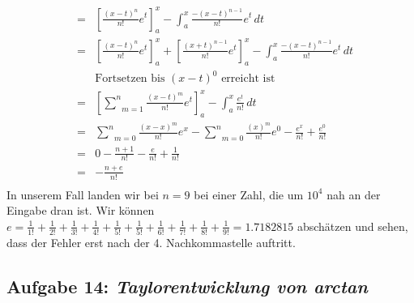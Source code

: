 \documentclass[11pt,a4paper,ngerman]{article}
\begin{document}
\begin{enumerate}[(i)]
$$\begin{array}{rcl}
                &=& \left[\frac{(x-t)^{n}}{n!}e^t\right]_a^x - \int_a^x \frac{-(x-t)^{n-1}}{n!}e^t \, dt\\
                &=& \left[\frac{(x-t)^{n}}{n!}e^t\right]_a^x + \left[\frac{(x+t)^{n-1}}{n!}e^t\right]_a^x
                    - \int_a^x \frac{-(x-t)^{n-1}}{n!}e^t \, dt\\
                && \text{Fortsetzen bis $(x-t)^0$ erreicht ist} \\
                &=& \left[ \underset{m=1}{\overset{n}{\sum}} \frac{(x-t)^m}{n!} e^t \right]_a^x 
                    - \int_a^x \frac{e^t}{n!} \, dt\\
                &=& \underset{m=0}{\overset{n}{\sum}} \frac{(x-x)^m}{n!}e^x - \underset{m=0}{\overset{n}{\sum}} \frac{(x)^m}{n!}e^0 - \frac{e^x}{n!} + \frac{e^0}{n!}\\
                &=& 0 - \frac{n+1}{n!} - \frac{e}{n!} + \frac{1}{n!}\\
                &=& - \frac{n+e}{n!}\\
        \end{array}$$
        In unserem Fall landen wir bei $n=9$ bei einer Zahl, die um $10^4$ nah an der Eingabe dran ist.
        Wir können $e = \frac{1}{1!} + \frac{1}{2!} + \frac{1}{3!} + \frac{1}{4!} + \frac{1}{5!}
        + \frac{1}{5!}+ \frac{1}{6!} + \frac{1}{7!} + \frac{1}{8!} + \frac{1}{9!} = 1.7182815$ abschätzen
        und sehen, dass der Fehler erst nach der 4. Nachkommastelle auftritt.
\end{enumerate}

\subsection*{Aufgabe 14: \mdseries\itshape Taylorentwicklung von arctan}
\end{document}
